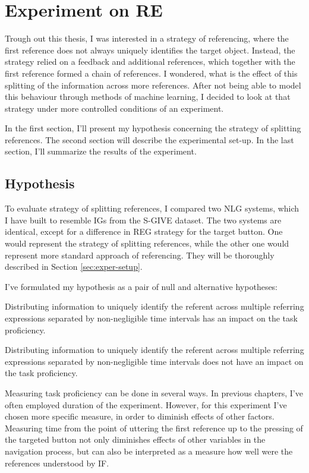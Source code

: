 \chapter{Experiment on RE}
Trough out this thesis, I was interested in a strategy of referencing, where the first reference does not always uniquely identifies the target object. Instead, the strategy relied on a feedback and additional references, which together with the first reference formed a chain of references. I wondered, what is the effect of this splitting of the information across more references. After not being able to model this behaviour through methods of machine learning, I decided to look at that strategy under more controlled conditions of an experiment.

In the first section, I'll present my hypothesis concerning the strategy of splitting references. The second section will describe the experimental set-up. In the last section, I'll summarize the results of the experiment.

\section{Hypothesis}
To evaluate strategy of splitting references, I compared two NLG systems, which I have built to resemble IGs from the S-GIVE dataset. The two systems are identical, except for a difference in REG strategy for the target button. One would represent the strategy of splitting references, while the other one would represent more standard approach of referencing. They will be thoroughly described in Section \ref{sec:exper-setup}.

I've formulated my hypothesis as a pair of null and alternative hypotheses:

\begin{nullhypo}
Distributing information to uniquely identify the referent across multiple referring expressions separated by non-negligible time intervals has an impact on the task proficiency.
\end{nullhypo}

\begin{alterhypo}
Distributing information to uniquely identify the referent across multiple referring expressions separated by non-negligible time intervals does not have an impact on the task proficiency.
\end{alterhypo}

Measuring task proficiency can be done in several ways. In previous chapters, I've often employed duration of the experiment. However, for this experiment I've chosen more specific measure, in order to diminish effects of other factors. Measuring time from the point of uttering the first reference up to the pressing of the targeted button not only diminishes effects of other variables in the navigation process, but can also be interpreted as a measure how well were the references understood by IF.

